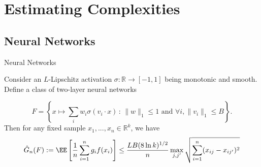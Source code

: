 \section{Estimating Complexities}



\subsection{Neural Networks}

\begin{frame}{Neural Networks}
    \begin{mytheorem}
        \label{theorem:nn-bound}
        Consider an $L$-Lipschitz activation $\sigma : \mathbb R \to [-1,1]$ being monotonic and smooth. Define a class of two-layer neural networks

        \begin{equation*}
            F = \left\{ x \mapsto \sum_i w_i \sigma(v_i \cdot x)\,:\, \|w\|_1\le 1 \text{ and } \forall i, \|v_i\|_1\le B \right\}.
        \end{equation*}
        Then for any fixed sample $x_1,...,x_n \in \mathbb R^k$, we have
        \begin{align*}
            \hat{G}_n(F) := \EE\left[\dfrac{1}{n}\sum\limits_{i=1}^n g_if(x_i)\right] \le \frac{LB(8\ln k)^{1/2}}{n}\max_{j,j'}\sqrt{\sum_{i=1}^n (x_{ij}-x_{ij'})^2}
        \end{align*}
    \end{mytheorem}
\end{frame}

